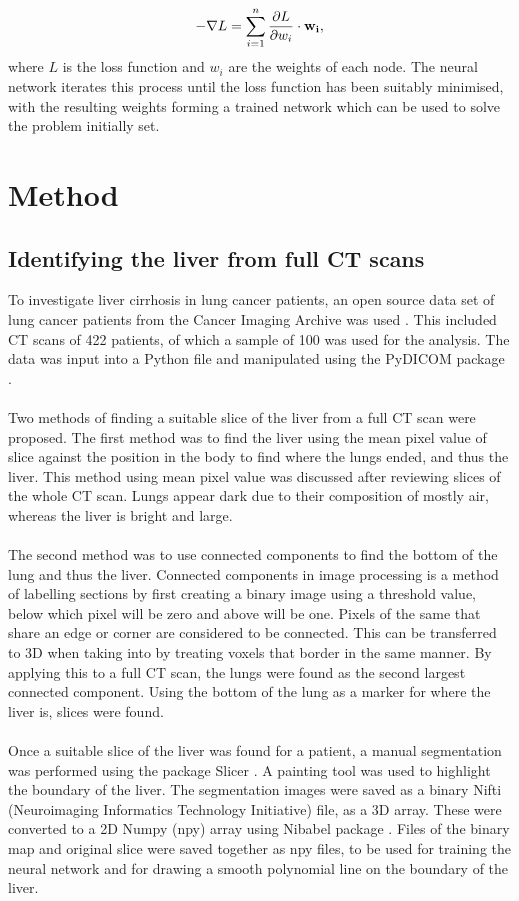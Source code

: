 \documentclass[12pt]{article}
\begin{document}
\begin{equation}
\centering
{-\nabla L}={\sum_{i=1}^n \frac{\partial L}{\partial w_i}\cdot \mathbf{w_i}},
\end{equation}
where $L$ is the loss function and $w_i$ are the weights of each node. The neural network iterates this process until the loss function has been suitably minimised, with the resulting weights forming a trained network which can be used to solve the problem initially set.

\section{Method}
\subsection{Identifying the liver from full CT scans}

To investigate liver cirrhosis in lung cancer patients, an open source data set of lung cancer patients from the Cancer Imaging Archive was used \cite{dataset}. This included CT scans of 422 patients, of which a sample of 100 was used for the analysis. The data was input into a Python file and manipulated using the PyDICOM package \cite{Mason:2011aa}.
\\ \\
Two methods of finding a suitable slice of the liver from a full CT scan were proposed. The first method was to find the liver using the mean pixel value of slice against the position in the body to find where the lungs ended, and thus the liver. This method using mean pixel value was discussed after reviewing slices of the whole CT scan. Lungs appear dark due to their composition of mostly air, whereas the liver is bright and large.
\\ \\
The second method was to use connected components to find the bottom of the lung and thus the liver. Connected components in image processing is a method of labelling sections by first creating a binary image using a threshold value, below which pixel will be zero and above will be one. Pixels of the same that share an edge or corner are considered to be connected. This can be transferred to 3D when taking into by treating voxels that border in the same manner. By applying this to a full CT scan, the lungs were found as the second largest connected component. Using the bottom of the lung as a marker for where the liver is, slices were found. 
\\ \\
Once a suitable slice of the liver was found for a patient, a manual segmentation was performed using the package Slicer \cite{slicer}. A painting tool was used to highlight the boundary of the liver. The segmentation images were saved as a binary Nifti (Neuroimaging Informatics Technology Initiative) file, as a 3D array. These were converted to a 2D Numpy (npy) array using Nibabel package \cite{nibabel}. Files of the binary map and original slice were saved together as npy files, to be used for training the neural network and for  drawing a smooth polynomial line on the boundary of the liver.
\end{document}
